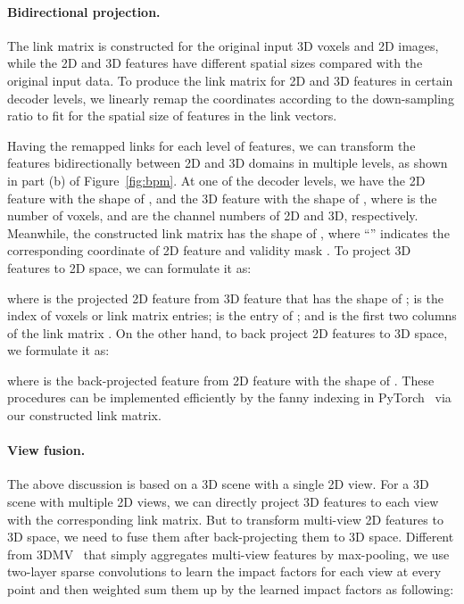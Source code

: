 \documentclass[final]{cvpr}
\begin{document}
\vspace{-5mm}
\paragraph{Bidirectional projection.}
The link matrix is constructed for the original input 3D voxels and 2D images, while the 2D and 3D features have different spatial sizes compared with the original input data.
To produce the link matrix for 2D and 3D features in certain decoder levels, we linearly remap the  coordinates according to the down-sampling ratio to fit for the spatial size of features in the link vectors.


Having the remapped links for each level of features, we can transform the features bidirectionally between 2D and 3D domains in multiple levels, as shown in part (b) of Figure~\ref{fig:bpm}.
At one of the decoder levels, we have the 2D feature  with the shape of , and the 3D feature  with the shape of   , where  is the number of voxels,  and  are the channel numbers of 2D and 3D, respectively.
Meanwhile, the constructed link matrix  has the shape of , where ``'' indicates the corresponding  coordinate of 2D feature and validity mask .
To project 3D features to 2D space, we can formulate it as:

where  is the projected 2D feature from 3D feature that has the shape of ;  is the index of voxels or link matrix entries;   is the  entry of ; and  is the first two columns of the link matrix .
On the other hand, to back project 2D features to 3D space, we formulate it as:
	\vspace{-1mm}

where  is the back-projected feature from 2D feature with the shape of .
These procedures can be implemented efficiently by the fanny indexing in PyTorch~\cite{paszke2019pytorch} via our constructed link matrix.



\vspace{-5mm}
\paragraph{View fusion.}
The above discussion is based on a 3D scene with a single 2D view.
For a 3D scene with multiple 2D views, we can directly project 3D features to each view with the corresponding link matrix.
But to transform multi-view 2D features to 3D space, we need to fuse them after back-projecting them to 3D space.
Different from 3DMV~\cite{dai20183dmv} that simply aggregates multi-view features by max-pooling, we use two-layer sparse convolutions to learn the impact factors for each view at every point and then weighted sum them up by the learned impact factors as following:
	\vspace{-2mm}
\end{document}
